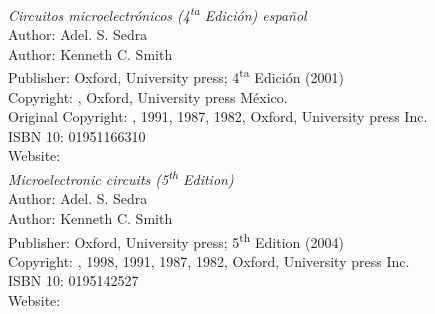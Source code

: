 \begin{thebibliography}{9}
\emph{Circuitos microelectrónicos (4\textsuperscript{ta} Edición) español}\\
Author: Adel. S. Sedra\\
Author: Kenneth C. Smith\\
Publisher: Oxford, University press; 4\textsuperscript{ta} Edición (2001)\\
Copyright: \textcopyright {}, Oxford, University press México.\\
Original Copyright: \textcopyright {}, 1991, 1987, 1982, Oxford, University press Inc.\\
ISBN 10: 01951166310\\
Website: \\




\emph{Microelectronic circuits (5\textsuperscript{th} Edition)}\\
Author: Adel. S. Sedra\\
Author: Kenneth C. Smith\\
Publisher: Oxford, University press; 5\textsuperscript{th} Edition (2004)\\
Copyright: \textcopyright {}, 1998, 1991, 1987, 1982, Oxford, University press Inc.\\
ISBN 10: 0195142527\\
Website: \\





\end{thebibliography}